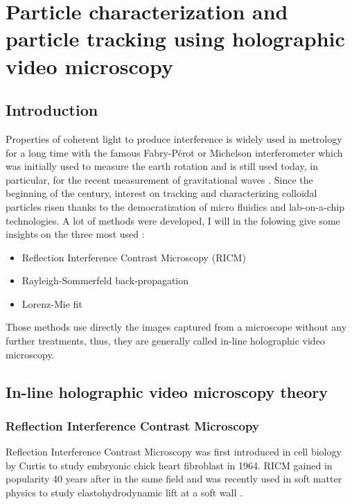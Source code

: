 \newpage
\section{Particle characterization and particle tracking using holographic video microscopy}
		\label{sec:chapter2}

\subsection{Introduction}

Properties of coherent light to produce interference is widely used in metrology for a long time with the famous Fabry-Pérot  \cite{fabry_theorie_1899, perot_application_1899} or Michelson interferometer \cite{michelson_relative_1887} which was initially used to measure the earth rotation and is still used today, in particular, for the recent measurement of gravitational waves
\cite{ligo_scientific_collaboration_and_virgo_collaboration_gw151226_2016}. 
Since the beginning of the century, interest on tracking and characterizing colloidal particles risen thanks to the democratization of micro fluidics and lab-on-a-chip technologies. A lot of methods were developed, I will in the folowing give some insights on the three most used :

\begin{itemize}
	\item Reflection Interference Contrast Microscopy (\gls{RICM})
	\item Rayleigh-Sommerfeld back-propagation
	\item Lorenz-Mie fit
\end{itemize}

Those methods use directly the images captured from a microscope without any further treatments, thus, they are generally called in-line holographic video microscopy.

\subsection{In-line holographic video microscopy theory}

\subsubsection{Reflection Interference Contrast Microscopy}


Reflection Interference Contrast Microscopy was first introduced in cell biology by Curtis to study embryonic chick heart fibroblast \cite{curtis_mechanism_1964} in 1964. \gls{RICM} gained in popularity 40 years after in the same field \cite{filler_reflection_2000, siver_use_2000, weber_2_2003, limozin_quantitative_2009} and was recently used in soft matter physics to study elastohydrodynamic lift at a soft wall \cite{davies_elastohydrodynamic_2018}.

